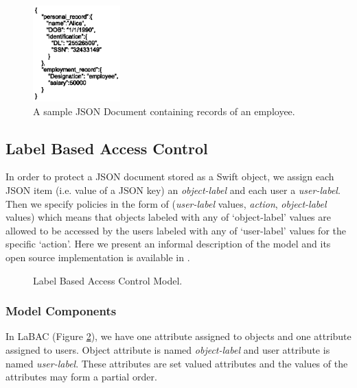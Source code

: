 \begin{figure}
  \centering
    \includegraphics[width=0.3\textwidth]{CODASPY15/json-data}
 \caption{A sample JSON Document containing   records of an employee.}
   \label{fig:json-data}
\end{figure}



\subsection{Label Based Access Control}
In order to protect a JSON document stored as a Swift object, we assign each JSON item (i.e. value of a JSON key) an \emph{object-label} and each user a \emph{user-label}. Then we specify policies  in the form of  (\emph{user-label} values, \emph{action},  \emph{object-label} values)   which means that objects labeled with any of `object-label' values are allowed to be accessed by the users labeled with any of  `user-label' values for the specific `action'. Here we present an informal description of the model and its open source implementation is available in \cite{labac}.

\begin{figure}
\centering
{}
\caption{Label Based Access Control Model.}
\label{fig:labac-model}
\end{figure}


\subsubsection{Model Components}

In LaBAC (Figure \ref{fig:labac-model}), we have one attribute assigned to objects and one attribute assigned to users. Object attribute is named  \emph{object-label} and user attribute is named \emph{user-label}. These attributes are set valued attributes and the values of the attributes may form a partial order.

